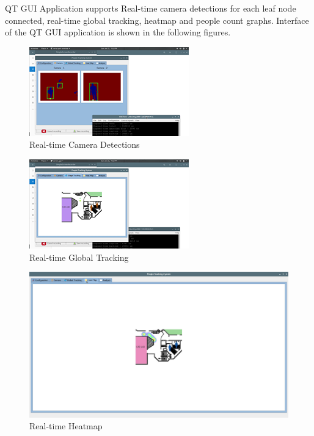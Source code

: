 \documentclass[12pt,a4paper]{report}
\begin{document}
QT GUI Application supports Real-time camera detections for each leaf node connected, real-time global tracking, heatmap and people count graphs. Interface of the QT GUI application is shown in the following figures.
\begin{figure}[H]
  \centering
  \includegraphics[width=\textwidth]{qt_cam.png}
  \caption{Real-time Camera Detections}
  \label{qt_graph1}
\end{figure}

\begin{figure}[H]
  \centering
  \includegraphics[width=\textwidth]{qt_tracking.png}
  \caption{Real-time Global Tracking}
  \label{qt_graph2}
\end{figure}

\begin{figure}[H]
  \centering
  \includegraphics[width=\textwidth]{qt_heatmap.png}
  \caption{Real-time Heatmap}
  \label{qt_graph3}
\end{figure}
\end{document}
